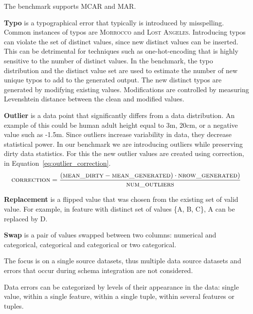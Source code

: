 The benchmark supports MCAR and MAR. 


\textbf{Typo} is a typographical error that typically is introduced by misspelling. 
Common instances of typos are \textsc{Morrocco} and \textsc{Lost Angeles}. 
Introducing typos can violate the set of distinct values, since new distinct values can be inserted.
This can be detrimental for techniques such as one-hot-encoding that is highly sensitive to the number of distinct values.
In the benchmark, the typo distribution and the distinct value set are used to estimate the number of new unique typos to add to the generated output. 
The new distinct typos are generated by modifying existing values. Modifications are controlled by measuring Levenshtein distance between the clean and modified values. 


\textbf{Outlier} is a data point that significantly differs from a data distribution.
An example of this could be human adult height equal to 3m, 20cm, or a negative value such as -1.5m. 
Since outliers increase variability in data, they decrease statistical power.
In our benchmark we are introducing outliers while preserving dirty data statistics. 
For this the new outlier values are created using correction, in Equation~\ref{eq:outlier_correction}. 
\begin{equation}
\label{eq:outlier_correction}
\textsc{correction} = \frac{(\textsc{mean\_dirty} - \textsc{mean\_generated}) \cdot \textsc{nrow\_generated})}{\textsc{num\_outliers}}
\end{equation}

\textbf{Replacement} is a flipped value that was chosen from the existing set of valid value. For example, in feature with distinct set of values \textsc{\{A, B, C\}}, \textsc{A} can be replaced by \textsc{D}. 


\textbf{Swap} is a pair of values swapped between two columns: numerical and categorical, categorical and categorical or two categorical.





The focus is on a single source datasets, thus multiple data source datasets and errors that occur during schema integration are not considered.


Data errors can be categorized by levels of their appearance in the data: single value, within a single feature, within a single tuple, within several features or tuples.


